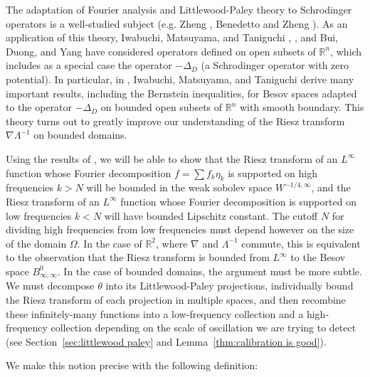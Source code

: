 \documentclass[11pt]{amsart}
\theoremstyle{remark}
\theoremstyle{definition}
\newcommand{\R}{\mathbb{R}}
\newcommand{\grad}{\nabla}
\newcommand{\Laplace}{\Delta}
\newcommand{\eigen}[1]{\eta_{#1}} %
\begin{document}
The adaptation of Fourier analysis and Littlewood-Paley theory to Schrodinger operators is a well-studied subject (e.g. Zheng \cite{Zh}, Benedetto and Zheng \cite{BeZh}).  As an application of this theory, Iwabuchi, Matsuyama, and Taniguchi \cite{IMT.besov}, \cite{IMT.schrodinger}, and Bui, Duong, and Yang \cite{BuDuYa} have considered operators defined on open subsets of $\R^n$, which includes as a special case the operator $-\Laplace_D$ (a Schrodinger operator with zero potential).  In particular, in \cite{IMT.bilinear},  Iwabuchi, Matsuyama, and Taniguchi derive many important results, including the Bernstein inequalities, for Besov spaces adapted to the operator $-\Laplace_D$ on bounded open subsets of $\R^n$ with smooth boundary.  This theory turns out to greatly improve our understanding of the Riesz transform $\grad \Lambda^{-1}$ on bounded domains.  


Using the results of \cite{IMT.bilinear}, we will be able to show that the Riesz transform of an $L^\infty$ function whose Fourier decomposition $f = \sum f_k \eigen{k}$ is supported on high frequencies $k > N$ will be bounded in the weak sobolev space $W^{-1/4,\infty}$, and the Riesz transform of an $L^\infty$ function whose Fourier decomposition is supported on low frequencies $k<N$ will have bounded Lipschitz constant.  The cutoff $N$ for dividing high frequencies from low frequencies must depend however on the size of the domain $\Omega$.  In the case of $\R^2$, where $\grad$  and $\Lambda^{-1}$ commute, this is equivalent to the observation that the Riesz transform is bounded from $L^\infty$ to the Besov space $B_{\infty,\infty}^0$.  In the case of bounded domains, the argument must be more subtle.  We must decompose $\theta$ into its Littlewood-Paley projections, individually bound the Riesz transform of each projection in multiple spaces, and then recombine these infinitely-many functions into a low-frequency collection and a high-frequency collection depending on the scale of oscillation we are trying to detect (see Section~\ref{sec:littlewood paley} and Lemma~\ref{thm:calibration is good}).  

We make this notion precise with the following definition:
\end{document}
